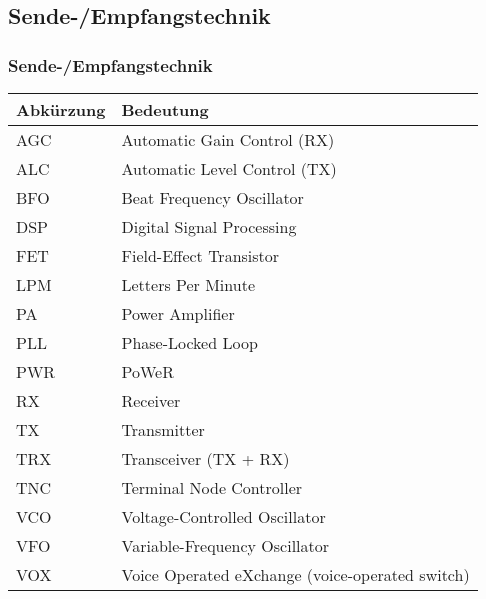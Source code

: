 \subsection*{Sende-/Empfangstechnik}
\begin{frame}
    \frametitle{Sende-/Empfangstechnik}

    \begin{center}
    \footnotesize
    \begin{tabular}{|l|l|}\hline
        \textbf{Abkürzung} & \textbf{Bedeutung}                         \\ \hline \hline
        AGC   & Automatic Gain Control (RX)                             \\ \hline
        ALC   & Automatic Level Control (TX)                            \\ \hline
        BFO   & Beat Frequency Oscillator                               \\ \hline
        DSP   & Digital Signal Processing                               \\ \hline
        FET   & Field-Effect Transistor                                 \\ \hline
        LPM   & Letters Per Minute                                      \\ \hline
        PA    & Power Amplifier                                         \\ \hline
        PLL   & Phase-Locked Loop                                       \\ \hline
        PWR   & PoWeR                                                   \\ \hline
        RX    & Receiver                                                \\ \hline
        TX    & Transmitter                                             \\ \hline
        TRX   & Transceiver (TX + RX)                                   \\ \hline
        TNC   & Terminal Node Controller                                \\ \hline
        VCO   & Voltage-Controlled Oscillator                           \\ \hline
        VFO   & Variable-Frequency Oscillator                           \\ \hline
        VOX   & Voice Operated eXchange (voice-operated switch)         \\ \hline
    \end{tabular}
    \end{center}

\end{frame}

